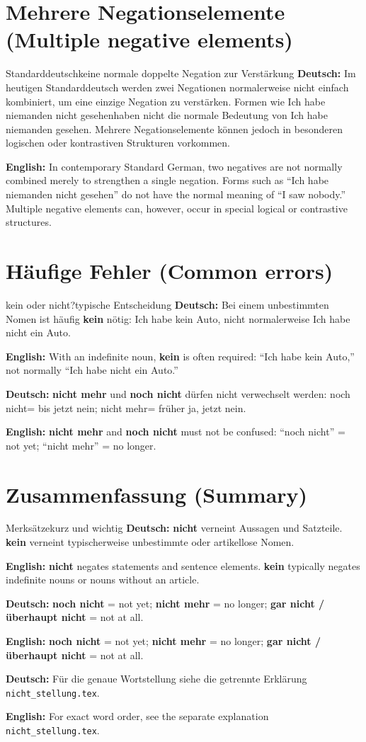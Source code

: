 \documentclass[a4paper,11pt]{article}
\newcommand{\GermanText}[1]{\textbf{Deutsch: }#1\par}
\newcommand{\EnglishText}[1]{{\small\color{SoftGray}\textbf{English: }#1\par}}
\begin{document}
\section{Mehrere Negationselemente \textnormal{(Multiple negative elements)}}
\begin{grammarentry}{Standarddeutsch}{keine normale doppelte Negation zur Verstärkung}
\GermanText{Im heutigen Standarddeutsch werden zwei Negationen normalerweise nicht einfach kombiniert, um eine einzige Negation zu verstärken. Formen wie \glqq Ich habe niemanden nicht gesehen\grqq haben nicht die normale Bedeutung von \glqq Ich habe niemanden gesehen\grqq. Mehrere Negationselemente können jedoch in besonderen logischen oder kontrastiven Strukturen vorkommen.}
\EnglishText{In contemporary Standard German, two negatives are not normally combined merely to strengthen a single negation. Forms such as ``Ich habe niemanden nicht gesehen'' do not have the normal meaning of ``I saw nobody.'' Multiple negative elements can, however, occur in special logical or contrastive structures.}
\end{grammarentry}

\section{Häufige Fehler \textnormal{(Common errors)}}
\begin{grammarentry}{kein oder nicht?}{typische Entscheidung}
\GermanText{Bei einem unbestimmten Nomen ist häufig \textbf{kein} nötig: \glqq Ich habe kein Auto\grqq, nicht normalerweise \glqq Ich habe nicht ein Auto\grqq.}
\EnglishText{With an indefinite noun, \textbf{kein} is often required: ``Ich habe kein Auto,'' not normally ``Ich habe nicht ein Auto.''}
\GermanText{\textbf{nicht mehr} und \textbf{noch nicht} dürfen nicht verwechselt werden: \glqq noch nicht\grqq = bis jetzt nein; \glqq nicht mehr\grqq = früher ja, jetzt nein.}
\EnglishText{\textbf{nicht mehr} and \textbf{noch nicht} must not be confused: ``noch nicht'' = not yet; ``nicht mehr'' = no longer.}
\end{grammarentry}

\section{Zusammenfassung \textnormal{(Summary)}}
\begin{grammarentry}{Merksätze}{kurz und wichtig}
\GermanText{\textbf{nicht} verneint Aussagen und Satzteile. \textbf{kein} verneint typischerweise unbestimmte oder artikellose Nomen.}
\EnglishText{\textbf{nicht} negates statements and sentence elements. \textbf{kein} typically negates indefinite nouns or nouns without an article.}
\GermanText{\textbf{noch nicht} = not yet; \textbf{nicht mehr} = no longer; \textbf{gar nicht / überhaupt nicht} = not at all.}
\EnglishText{\textbf{noch nicht} = not yet; \textbf{nicht mehr} = no longer; \textbf{gar nicht / überhaupt nicht} = not at all.}
\GermanText{Für die genaue Wortstellung siehe die getrennte Erklärung \texttt{nicht\_stellung.tex}.}
\EnglishText{For exact word order, see the separate explanation \texttt{nicht\_stellung.tex}.}
\end{grammarentry}
\end{document}
